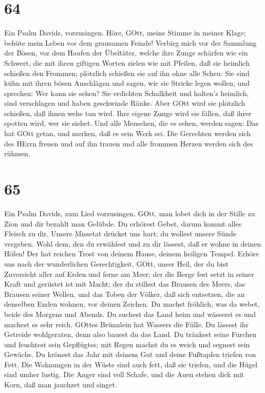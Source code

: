 \hypertarget{section-63}{%
\section{64}\label{section-63}}

 Ein Psalm Davids, vorzusingen.  Höre, GOtt,
meine Stimme in meiner Klage; behüte mein Leben vor dem grausamen
Feinde!  Verbirg mich vor der Sammlung der Bösen, vor dem
Haufen der Übeltäter,  welche ihre Zunge schärfen wie ein
Schwert, die mit ihren giftigen Worten zielen wie mit Pfeilen,
 daß sie heimlich schießen den Frommen; plötzlich schießen
sie auf ihn ohne alle Scheu.  Sie sind kühn mit ihren bösen
Anschlägen und sagen, wie sie Stricke legen wollen, und sprechen: Wer
kann sie sehen?  Sie erdichten Schalkheit und halten's
heimlich, sind verschlagen und haben geschwinde Ränke.  Aber
GOtt wird sie plötzlich schießen, daß ihnen wehe tun wird. 
Ihre eigene Zunge wird sie fällen, daß ihrer spotten wird, wer sie
siehet.  Und alle Menschen, die es sehen, werden sagen: Das
hat GOtt getan, und merken, daß es sein Werk sei.  Die
Gerechten werden sich des HErrn freuen und auf ihn trauen und alle
frommen Herzen werden sich des rühmen.

\hypertarget{section-64}{%
\section{65}\label{section-64}}

 Ein Psalm Davids, zum Lied vorzusingen.  GOtt,
man lobet dich in der Stille zu Zion und dir bezahlt man Gelübde.
 Du erhörest Gebet, darum kommt alles Fleisch zu dir.
 Unsere Missetat drücket uns hart; du wollest unsere Sünde
vergeben.  Wohl dem, den du erwählest und zu dir lässest,
daß er wohne in deinen Höfen! Der hat reichen Trost von deinem Hause,
deinem heiligen Tempel.  Erhöre uns nach der wunderlichen
Gerechtigkeit, GOtt, unser Heil, der du bist Zuversicht aller auf Erden
und ferne am Meer;  der die Berge fest setzt in seiner Kraft
und gerüstet ist mit Macht;  der du stillest das Brausen des
Meers, das Brausen seiner Wellen, und das Toben der Völker, 
daß sich entsetzen, die an denselben Enden wohnen, vor deinen Zeichen.
Du machst fröhlich, was da webet, beide des Morgens und Abends.
 Du suchest das Land heim und wässerst es und machest es
sehr reich. GOttes Brünnlein hat Wassers die Fülle. Du lässest ihr
Getreide wohlgeraten, denn also bauest du das Land.  Du
tränkest seine Furchen und feuchtest sein Gepflügtes; mit Regen machst
du es weich und segnest sein Gewächs.  Du krönest das Jahr
mit deinem Gut und deine Fußtapfen triefen von Fett.  Die
Wohnungen in der Wüste sind auch fett, daß sie triefen, und die Hügel
sind umher lustig.  Die Anger sind voll Schafe, und die
Auen stehen dick mit Korn, daß man jauchzet und singet.


